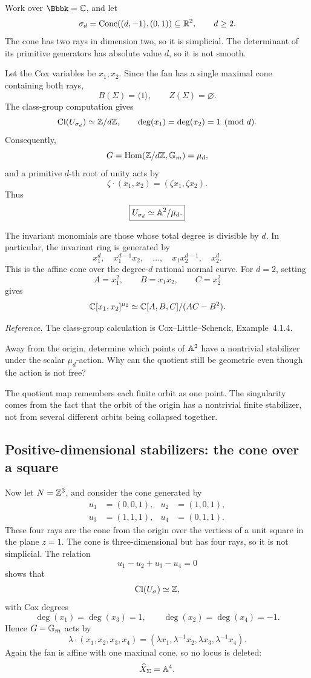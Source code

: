 Work over \(\Bbbk=\CC\), and let
\[
\sigma_d
=
\operatorname{Cone}((d,-1),(0,1))
\subseteq\mathbb{R}^2,
\qquad d\geq2.
\]
The cone has two rays in dimension two, so it is simplicial. The
determinant of its primitive generators has absolute value \(d\), so
it is not smooth.

Let the Cox variables be \(x_1,x_2\). Since the fan has a single
maximal cone containing both rays,
\[
B(\Sigma)=\langle1\rangle,
\qquad
Z(\Sigma)=\varnothing.
\]
The class-group computation gives
\[
\operatorname{Cl}(U_{\sigma_d})\simeq\mathbb{Z}/d\mathbb{Z},
\qquad
\deg(x_1)=\deg(x_2)=1\pmod d.
\]
Consequently,
\[
G=\operatorname{Hom}(\mathbb{Z}/d\mathbb{Z},\mathbb{G}_{m})=\mu_d,
\]
and a primitive \(d\)-th root of unity acts by
\[
\zeta\cdot(x_1,x_2)
=
(\zeta x_1,\zeta x_2).
\]
Thus
\[
\boxed{
U_{\sigma_d}
\simeq
\mathbb{A}^2/\mu_d.
}
\]

The invariant monomials are those whose total degree is divisible by
\(d\). In particular, the invariant ring is generated by
\[
x_1^d,
\quad
x_1^{d-1}x_2,
\quad\dots,\quad
x_1x_2^{d-1},
\quad
x_2^d.
\]
This is the affine cone over the degree-\(d\) rational normal curve.
For \(d=2\), setting
\[
A=x_1^2,
\qquad
B=x_1x_2,
\qquad
C=x_2^2
\]
gives
\[
\mathbb{C}[x_1,x_2]^{\mu_2}
\simeq
\mathbb{C}[A,B,C]/(AC-B^2).
\]

\noindent
\textit{Reference.}
The class-group calculation is Cox--Little--Schenck,
Example~4.1.4.

\begin{pauseandthink}
Away from the origin, determine which points of \(\mathbb{A}^2\) have a
nontrivial stabilizer under the scalar \(\mu_d\)-action. Why can the
quotient still be geometric even though the action is not free?
\end{pauseandthink}

The quotient map remembers each finite orbit as one point. The
singularity comes from the fact that the orbit of the origin has a
nontrivial finite stabilizer, not from several different orbits being
collapsed together.

\subsection{Positive-dimensional stabilizers: the cone over a square}

Now let \(N=\mathbb{Z}^3\), and consider the cone generated by
\[
\begin{aligned}
u_1&=(0,0,1),&
u_2&=(1,0,1),\\
u_3&=(1,1,1),&
u_4&=(0,1,1).
\end{aligned}
\]
These four rays are the cone from the origin over the vertices of a
unit square in the plane \(z=1\). The cone is three-dimensional but
has four rays, so it is not simplicial. The relation
\[
u_1-u_2+u_3-u_4=0
\]
shows that
\[
\operatorname{Cl}(U_\sigma)\simeq\mathbb{Z},
\]
with Cox degrees
\[
\deg(x_1)=\deg(x_3)=1,
\qquad
\deg(x_2)=\deg(x_4)=-1.
\]
Hence \(G=\mathbb{G}_{m}\) acts by
\[
\lambda\cdot(x_1,x_2,x_3,x_4)
=
(\lambda x_1,\lambda^{-1}x_2,
 \lambda x_3,\lambda^{-1}x_4).
\]
Again the fan is affine with one maximal cone, so no locus is deleted:
\[
\widehat X_\Sigma=\mathbb{A}^4.
\]

